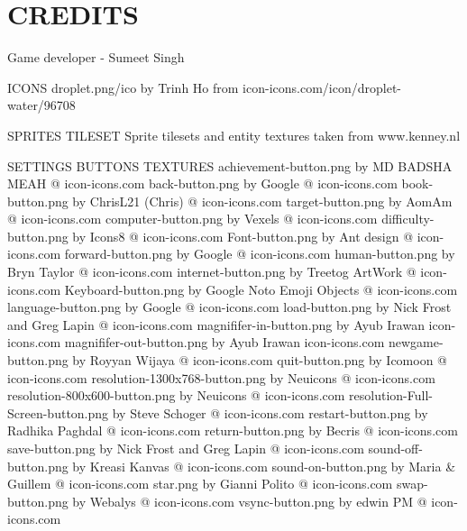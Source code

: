 \chapter{CREDITS}
\hypertarget{md__c_r_e_d_i_t_s}{}\label{md__c_r_e_d_i_t_s}
\label{md__c_r_e_d_i_t_s_autotoc_md19}%
%
 \begin{DoxyVerb}                    Game developer - Sumeet Singh

                                ICONS
droplet.png/ico by Trinh Ho from icon-icons.com/icon/droplet-water/96708

                              SPRITES TILESET
        Sprite tilesets and entity textures taken from www.kenney.nl        


                    SETTINGS BUTTONS TEXTURES
                achievement-button.png by MD BADSHA MEAH @ icon-icons.com
                back-button.png by Google @ icon-icons.com
                book-button.png by ChrisL21 (Chris) @ icon-icons.com
                target-button.png by AomAm @ icon-icons.com
                computer-button.png by Vexels @ icon-icons.com
                difficulty-button.png by Icons8 @ icon-icons.com
                Font-button.png by Ant design @ icon-icons.com
                forward-button.png by Google @ icon-icons.com
                human-button.png by Bryn Taylor @ icon-icons.com
                internet-button.png by Treetog ArtWork @ icon-icons.com
                Keyboard-button.png by Google Noto Emoji Objects @ icon-icons.com
                language-button.png by Google @ icon-icons.com
                load-button.png by Nick Frost and Greg Lapin @ icon-icons.com
                magnififer-in-button.png by Ayub Irawan icon-icons.com
                magnififer-out-button.png by Ayub Irawan icon-icons.com
                newgame-button.png by Royyan Wijaya @ icon-icons.com
                quit-button.png by Icomoon @ icon-icons.com
                resolution-1300x768-button.png by Neuicons @ icon-icons.com
                resolution-800x600-button.png by Neuicons @ icon-icons.com
                resolution-Full-Screen-button.png by Steve Schoger @ icon-icons.com
                restart-button.png by Radhika Paghdal @ icon-icons.com
                return-button.png by Becris @ icon-icons.com
                save-button.png by Nick Frost and Greg Lapin @ icon-icons.com
                sound-off-button.png by Kreasi Kanvas @ icon-icons.com
                sound-on-button.png by Maria & Guillem @ icon-icons.com
                star.png by Gianni Polito @ icon-icons.com
                swap-button.png by Webalys @ icon-icons.com
                vsync-button.png by edwin PM @ icon-icons.com


\end{DoxyVerb}
